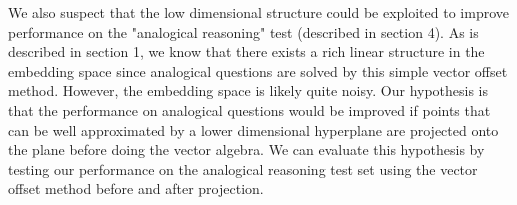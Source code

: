 We also suspect that the low dimensional structure could be exploited to improve performance on the "analogical reasoning" test (described in section 4). 
As is described in section 1, we know that there exists a rich linear structure in the embedding space since analogical questions are solved by this simple vector offset method. 
However, the embedding space is likely quite noisy. 
Our hypothesis is that the performance on analogical questions would be improved if points that can be well approximated by a lower dimensional hyperplane are projected onto the plane before doing the vector algebra. 
We can evaluate this hypothesis by testing our performance on the analogical reasoning test set using the vector offset method before and after projection. 

